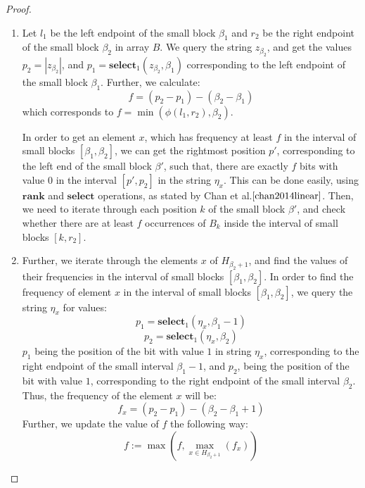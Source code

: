 \documentclass[runningheads]{llncs}
\begin{document}
\begin{proof}
\begin{enumerate}
        \item   Let $l_1$ be the left endpoint of the small block $\beta_1$ and $r_2$ be the right endpoint of the small block $\beta_2$ in array $B$.        
                We query the string $z_{\beta_2}$, and get the values $p_2=|z_{\beta_2}|$, and $p_1=\textbf{select}_{1}(z_{\beta_2}, \beta_1)$ 
                corresponding to the left endpoint of the small block $\beta_1$. 
                Further, we calculate:
                \[
                    f = ( p_2 - p_1 )-( \beta_2 - \beta_1 )
                \] 
                which corresponds to $f=\min( \phi(  l_1, r_2 ), \beta_2)$.

                In order to get an element $x$, which has frequency at least $f$ in the interval of small blocks $[\beta_1, \beta_2]$, we can get the rightmost position $p'$, 
                corresponding to the left end of the small block $\beta'$, such that, there are exactly $f$ bits with value $0$ in the interval $[p', p_2]$ in the string $\eta_x$. 
                This can be done easily, using $\textbf{rank}$ and $\textbf{select}$ 
                operations, as stated by Chan et al.$\cite{chan2014linear}$. Then, we need to iterate 
                through each position $k$ of the small block $\beta'$, and check whether there are at least $f$ occurrences of $B_k$ inside the interval of small blocks $[ k , r_2 ]$.

        \item Further, we iterate through the elements $x$ of $H_{\beta_2+1}$, and find the values of their frequencies in the interval of small blocks $[\beta_1,\beta_2]$.
              In order to find the frequency of element $x$ in the interval of small blocks $[\beta_1, \beta_2]$, we query the string $\eta_x$ for values:
              \[
                    p_1=\textbf{select}_1(\eta_x,\beta_1-1)
              \]
              \[
                    p_2 = \textbf{select}_1(\eta_x, \beta_2 )
              \]
            $p_1$ being the position of the bit with value $1$ in string $\eta_x$, corresponding to the right endpoint of the small interval $\beta_1-1$, and $p_2$, being the position 
            of the bit with value $1$, corresponding to the right endpoint of the small interval $\beta_2$.
            Thus, the  frequency of the element $x$ will be:
            \[
                f_x=(p_2-p_1)-( \beta_2-\beta_1+1 )
            \]
            Further, we update the value of $f$ the following way: 
            \[
                f := \max(f, \max_{x \in H_{\beta_2+1}}(f_x) )
            \]


\end{enumerate}
\end{proof}
\end{document}
